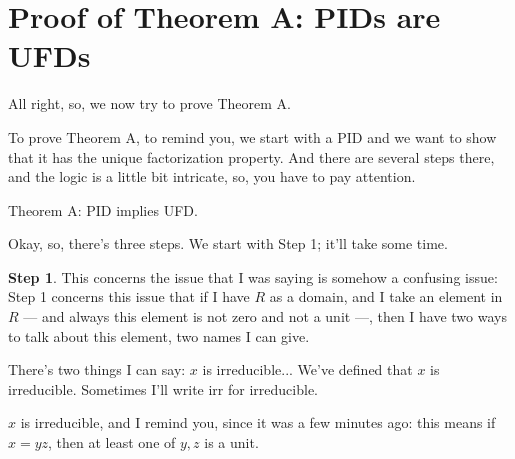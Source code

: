 \begin{hidden}
\end{hidden}

\section{Proof of Theorem A: PIDs are UFDs}

\begin{speech}[00:28:25 - 00:30:11]
All right, so, we now try to prove Theorem A. 

To prove Theorem A, to remind you, we start with a PID and we want to show that it has the unique factorization property. And there are several steps there, and the logic is a little bit intricate, so, you have to pay attention. 

Theorem A:  PID  implies  UFD. 

Okay, so, there's three steps. We start with Step 1; it'll take some time.

\textbf{Step 1}.  This concerns the issue that I was saying is somehow a confusing issue: Step 1 concerns this issue that if I have $R$ as a domain,  and I take an element in $R$ --- and always this element is not zero and not a unit ---,  then I have two ways to talk about this element, two names I can give.

There's two things I can say: $x$ is irreducible...  We've defined that $x$ is irreducible. Sometimes I'll write $\text{irr}$ for irreducible.

$x$ is irreducible, and I remind you, since it was a few minutes ago: this means if $x = y z$,  then at least one  of $y, z$ is a unit.
\end{speech}

